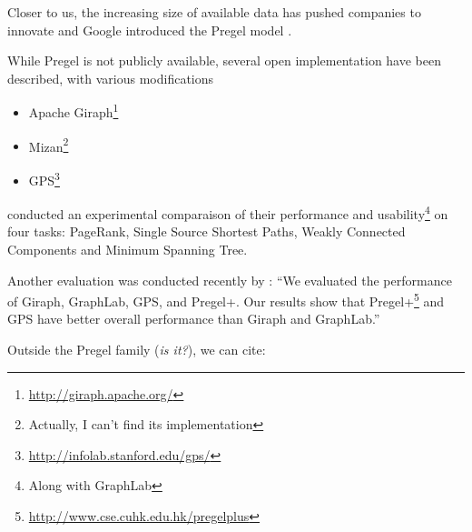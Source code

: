 Closer to us, the increasing size of available data has pushed companies to
innovate and Google introduced the Pregel model \autocite{Pregel10}.

While Pregel is not publicly available, several open implementation have been
described, with various modifications

\begin{itemize}
	\item Apache
		Giraph\footnote{\href{http://giraph.apache.org/}{http://giraph.apache.org/}}
	\item Mizan\footnote{Actually, I can't find its implementation} \autocite{Khayyat2013}
	\item
		GPS\footnote{\href{http://infolab.stanford.edu/gps/}{http://infolab.stanford.edu/gps/}}
		\autocite{Salihoglu2013}
\end{itemize}

\Textcite{Han2014} conducted an experimental comparaison of their performance and
usability\footnote{Along with GraphLab} on four tasks: PageRank, Single Source
Shortest Paths, Weakly Connected Components and Minimum Spanning Tree.

Another evaluation was conducted recently by \textcite{Lu2015}: \enquote{We
evaluated the performance of Giraph, GraphLab, GPS, and Pregel+. Our results
show that
Pregel+\footnote{\href{http://www.cse.cuhk.edu.hk/pregelplus/index.html}%
{http://www.cse.cuhk.edu.hk/pregelplus}} \autocite{Yan2015} and GPS have
better overall performance than Giraph and GraphLab.}

Outside the Pregel family (\emph{is it?}), we can cite:

